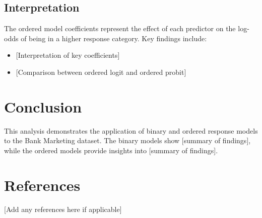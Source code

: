 \documentclass[
  letterpaper,
  DIV=11,
  numbers=noendperiod]{scrartcl}
\providecommand{\tightlist}{%
  \setlength{\itemsep}{0pt}\setlength{\parskip}{0pt}}
\begin{document}
\subsection{Interpretation}\label{interpretation}

The ordered model coefficients represent the effect of each predictor on
the log-odds of being in a higher response category. Key findings
include:

\begin{itemize}
\tightlist
\item
  {[}Interpretation of key coefficients{]}
\item
  {[}Comparison between ordered logit and ordered probit{]}
\end{itemize}

\section{Conclusion}\label{conclusion}

This analysis demonstrates the application of binary and ordered
response models to the Bank Marketing dataset. The binary models show
{[}summary of findings{]}, while the ordered models provide insights
into {[}summary of findings{]}.

\section{References}\label{references}

{[}Add any references here if applicable{]}
\end{document}
